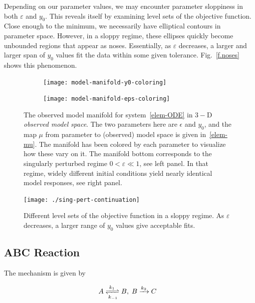 \documentclass[11pt]{article}
\newcommand{\eps}{\varepsilon}
\begin{document}
Depending on our parameter values, we may encounter parameter
sloppiness in both $\eps$ and $y_0$. This reveals itself by examining
level sets of the objective function. Close enough to the minimum, we
necessarily have elliptical contours in parameter space. However, in a
sloppy regime, these ellipses quickly become unbounded regions that
appear as noses. Essentially, as $\eps$ decreases, a larger and larger
span of $y_0$ values fit the data within some given
tolerance. Fig.~\ref{f.noses} shows this phenomenon.

\begin{figure}[ht!]
  \begin{subfigure}[t]{0.49\textwidth}
    \centering
    \texttt{[image: model-manifold-y0-coloring]}
  \end{subfigure}
  \begin{subfigure}[t]{0.49\textwidth}
    \centering
    \texttt{[image: model-manifold-eps-coloring]}
  \end{subfigure} %
  \caption{The observed model manifold for
    system~\eqref{elem-ODE} in $3-$D \emph{observed model space}. The
    two parameters here are $\epsilon$ and $y_0$, and the map $\mu$
    from parameter to (observed) model space is given
    in~\eqref{elem-mu}. The manifold has been colored by each
    parameter to visualize how these vary on it. The manifold bottom
    corresponds to the singularly perturbed regime $0 < \eps \ll 1$,
    see left panel. In that regime, widely different initial
    conditions yield nearly identical model responses, see right
    panel. \label{f.elem.ex.1}}
\end{figure}

\begin{figure}[htbp]
  \centering
  \texttt{[image: ./sing-pert-continuation]}
  \caption{Different level sets of the objective function in a sloppy
    regime. As $\eps$ decreases, a larger range of $y_0$ values give
    acceptable fits.}
\end{figure}

\subsection{ABC Reaction}

The mechanism is given by

\begin{align*}
  A \xrightleftharpoons[k_{-1}]{k_1} B, \; B \xrightarrow[]{k_2} C
\end{align*}
\end{document}
